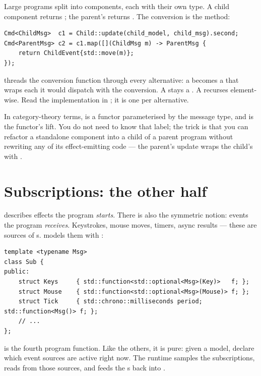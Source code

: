 Large programs split into components, each with their own
 type. A child component returns ; the
parent's  returns . The
conversion is the  method:

\begin{lstlisting}
Cmd<ChildMsg>  c1 = Child::update(child_model, child_msg).second;
Cmd<ParentMsg> c2 = c1.map([](ChildMsg m) -> ParentMsg {
    return ChildEvent{std::move(m)};
});
\end{lstlisting}

 threads the conversion function through every alternative:
a  becomes a 
that wraps each  it would dispatch with the
conversion. A  stays a . A 
recurses element-wise. Read the implementation in ;
it is one  per alternative.

In category-theory terms,  is a functor parameterised by
the message type, and  is the functor's lift. You do not
need to know that label; the trick is that you can refactor a
standalone component into a child of a parent program without
rewriting any of its effect-emitting code --- the parent's update
wraps the child's  with .

\section{Subscriptions: the other half}

 describes effects the program \emph{starts}. There is also
the symmetric notion: events the program \emph{receives}. Keystrokes,
mouse moves, timers, async results --- these are sources of
s. \maya{} models them with :

\begin{lstlisting}
template <typename Msg>
class Sub {
public:
    struct Keys     { std::function<std::optional<Msg>(Key)>   f; };
    struct Mouse    { std::function<std::optional<Msg>(Mouse)> f; };
    struct Tick     { std::chrono::milliseconds period; std::function<Msg()> f; };
    // ...
};
\end{lstlisting}

 is the fourth program
function. Like the others, it is pure: given a model, declare which
event sources are active right now. The runtime samples the
subscriptions, reads from those sources, and feeds the s
back into .

